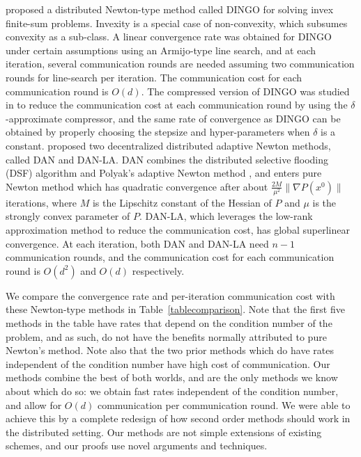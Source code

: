 \documentclass[12pt]{article}
\begin{document}
\citet{DINGO2019} proposed a distributed Newton-type method called DINGO   for solving  invex finite-sum problems. Invexity is a special case of non-convexity, which subsumes convexity as a sub-class. A linear convergence rate was obtained for DINGO under certain assumptions using an Armijo-type line search, and at each iteration, several communication rounds are needed assuming two communication rounds for line-search per iteration. The communication cost for each communication round is $O(d)$. The compressed version of DINGO was studied in \citep{Ghosh2020} to reduce the communication cost at each communication round by using the $\delta$-approximate compressor, and the same rate of convergence as DINGO can be obtained by properly choosing the stepsize and hyper-parameters when $\delta$ is a constant.  \citet{DAN2020} proposed two decentralized distributed adaptive Newton methods, called DAN and DAN-LA. DAN combines the distributed selective flooding (DSF) algorithm and Polyak’s adaptive Newton method \citep{polyak2020new}, and enters pure Newton method which has quadratic convergence after about $\frac{2M}{\mu^2} \|\nabla P(x^0)\|$ iterations, where $M$ is the Lipschitz constant of the Hessian of $P$ and $\mu$ is the strongly convex parameter of $P$. DAN-LA, which leverages the low-rank approximation method to reduce the communication cost, has global superlinear convergence. At each iteration, both DAN and DAN-LA need $n-1$ communication rounds, and the communication cost for each communication round is $O(d^2)$ and $O(d)$ respectively. 

We compare the convergence rate and per-iteration communication cost with these Newton-type methods in Table~\ref{tablecomparison}. Note that the first five methods in the table have rates that depend on the condition number of the problem, and as such, do not have the benefits normally attributed to pure Newton's method. Note also that the two prior methods which do have rates independent of the condition number have high cost of communication. Our methods combine the best of both worlds, and are the only methods we know about which do so: we obtain fast rates independent of the condition number, and allow for $O(d)$ communication per communication round.  We were able to achieve this by a complete redesign of how second order methods should work in the distributed setting. Our methods are not simple extensions of existing schemes, and our proofs use novel arguments and techniques.
\end{document}
